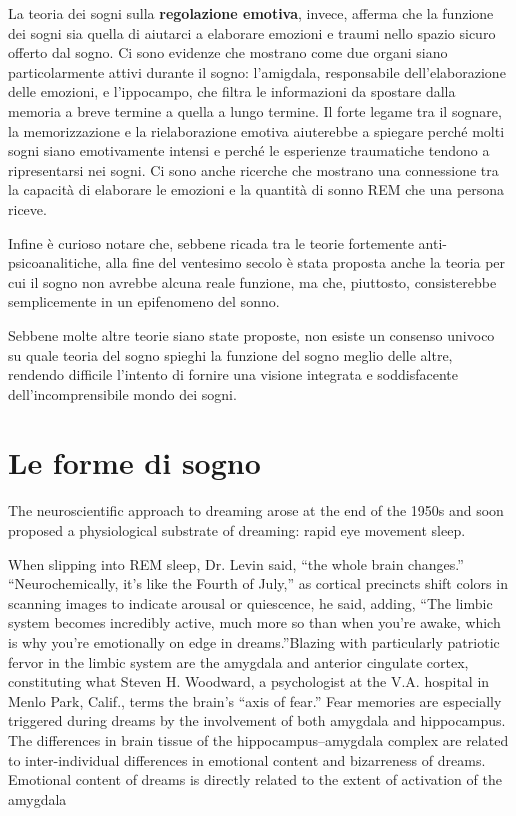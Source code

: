 
La teoria dei sogni sulla \textbf{regolazione emotiva}, invece, afferma che la funzione dei sogni sia quella di aiutarci
a elaborare emozioni e traumi nello spazio sicuro offerto dal sogno.
Ci sono evidenze che mostrano come due organi siano particolarmente attivi durante il sogno: l'amigdala,
responsabile dell'elaborazione delle emozioni, e l'ippocampo, che filtra
le informazioni da spostare dalla memoria a breve termine a quella a lungo termine.
Il forte legame tra il sognare, la memorizzazione e la rielaborazione emotiva aiuterebbe a spiegare perché molti sogni
siano emotivamente intensi e perché le esperienze traumatiche tendono a ripresentarsi nei sogni.
Ci sono anche ricerche che mostrano una connessione tra la capacità di elaborare le emozioni e la quantità di sonno
REM che una persona riceve. \newline

Infine è curioso notare che, sebbene ricada tra le teorie fortemente anti-psicoanalitiche, alla fine del
ventesimo secolo è stata proposta anche la teoria per cui il sogno non avrebbe alcuna reale funzione, ma che,
piuttosto, consisterebbe semplicemente in un epifenomeno del sonno.

Sebbene molte altre teorie siano state proposte, non esiste un consenso univoco su quale teoria del sogno
spieghi la funzione del sogno meglio delle altre, rendendo difficile l'intento di fornire una visione integrata e
soddisfacente dell'incomprensibile mondo dei sogni.

\section{Le forme di sogno}

The neuroscientific approach to dreaming arose at the end of the 1950s and soon proposed a physiological substrate of
dreaming: rapid eye movement sleep.

When slipping into REM sleep, Dr. Levin said, “the whole brain changes.” “Neurochemically,
it’s like the Fourth of July,” as cortical precincts shift colors in scanning images to indicate arousal or quiescence,
he said, adding, “The limbic system becomes incredibly active, much more so than when you’re awake, which is why you’re
emotionally on edge in dreams.”Blazing with particularly patriotic fervor in the limbic system are the amygdala and
anterior cingulate cortex, constituting what Steven H. Woodward, a psychologist at the V.A. hospital in Menlo Park,
Calif., terms the brain’s “axis of fear.”
Fear memories are especially triggered during dreams by the involvement of both amygdala and hippocampus.
The differences in brain tissue of the hippocampus–amygdala complex are related to inter-individual differences
in emotional content and bizarreness of dreams.
Emotional content of dreams is directly related to the extent of activation of the amygdala


